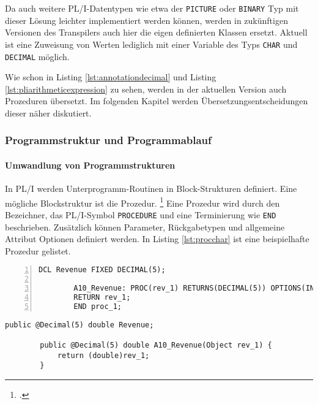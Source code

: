 Da auch weitere PL/I-Datentypen wie etwa der \verb+PICTURE+ oder \verb+BINARY+ Typ mit dieser Lösung leichter implementiert werden können, werden in zukünftigen Versionen des Transpilers auch hier die eigen definierten Klassen ersetzt.
Aktuell ist eine Zuweisung von Werten lediglich mit einer Variable des Typs \verb+CHAR+ und \verb+DECIMAL+ möglich.

Wie schon in Listing \ref{lst:annotationdecimal} und Listing \ref{lst:pliarithmeticexpression} zu sehen, werden in der aktuellen Version auch Prozeduren übersetzt.
Im folgenden Kapitel werden Übersetzungsentscheidungen dieser näher diskutiert.


\subsubsection{Programmstruktur und Programmablauf}
\paragraph*{Umwandlung von Programmstrukturen }\label{programstruct}

In PL/I werden Unterprogramm-Routinen in Block-Strukturen definiert. Eine mögliche Blockstruktur ist die Prozedur. \footcite[Vgl. ][S. 97ff. ]{pliref}
Eine Prozedur wird durch den Bezeichner, das PL/I-Symbol \verb+PROCEDURE+ und eine Terminierung wie \verb+END+ beschrieben.
Zusätzlich können Parameter, Rückgabetypen und allgemeine Attribut Optionen definiert werden. In Listing \ref{lst:procchar} ist eine beispielhafte Prozedur gelistet.

\begin{minipage}[b]{0.48\linewidth}
	\centering
	\lstset{language=PL/I,label=SliceExaple}
	\begin{lstlisting}[frame=single, numbers=left, mathescape,%
		caption={Transformation einer Prozedur}, label={lst:procchar},
		basicstyle=\fontsize{9}{13}\selectfont\ttfamily]
		DCL Revenue FIXED DECIMAL(5);
		
		A10_Revenue: PROC(rev_1) RETURNS(DECIMAL(5)) OPTIONS(INLINE);
		RETURN rev_1;
		END proc_1;
	\end{lstlisting}
\end{minipage}
\hspace{0.5cm}
\begin{minipage}[b]{0.48\linewidth}
	\centering
	\lstset{language=Java,label=SliceExaple}
	\begin{lstlisting}[frame=single, mathescape,%
		title={" "},
		basicstyle=\fontsize{9}{13}\selectfont\ttfamily]
		public @Decimal(5) double Revenue;		
		
		public @Decimal(5) double A10_Revenue(Object rev_1) { 
			return (double)rev_1;
		}
	\end{lstlisting}
\end{minipage}

